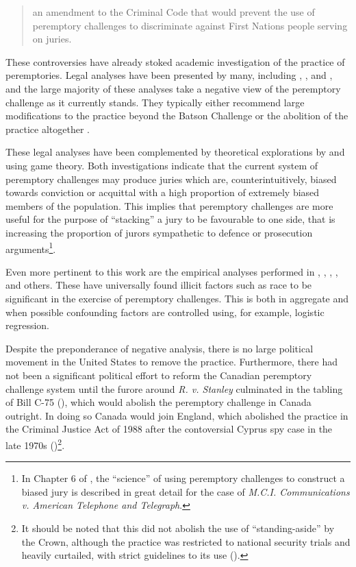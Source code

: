 \begin{quote}
  an amendment to the Criminal Code that would prevent the use of peremptory challenges to discriminate against First Nations
  people serving on juries.
\end{quote}

These controversies have already stoked academic investigation of the practice of peremptories. Legal analyses have been
presented by many, including \cite{hoffman1997}, \cite{broderick1992}, and \cite{Nunn1993}, and the large majority of these
analyses take a negative view of the peremptory challenge as it currently stands. They typically either recommend large
modifications to the practice beyond the Batson Challenge or the abolition of the practice altogether .

These legal analyses have been complemented by theoretical explorations by \cite{ford2010} and \cite{flanagan2015} using game
theory. Both investigations indicate that the current system of peremptory challenges may produce juries which are, counterintuitively, biased
towards conviction or acquittal with a high proportion of extremely biased members of the population. This implies that peremptory challenges are more useful for the purpose of ``stacking'' a jury to be favourable to one side, that is increasing the proportion of jurors sympathetic to defence or prosecution arguments\footnote{In Chapter 6 of \cite{hansvidjudging}, the ``science'' of using peremptory challenges to construct a biased jury is described in great detail for the case of \textit{M.C.I. Communications v. American Telephone and Telegraph}.}.

Even more pertinent to this work are the empirical analyses performed in \cite{PerempChalMurder}, \cite{JurySunshineProj},
\cite{StubbornLegacy}, \cite{baldus2012}, and others. These have
universally found illicit factors such as race to be significant in
the exercise of peremptory challenges. This is both in aggregate and when possible confounding factors are controlled using, for example,
logistic regression.

Despite the preponderance of negative analysis, there is no large political movement in the United States to remove the
practice. Furthermore, there had not been a significant political effort to reform the Canadian peremptory challenge system until the
furore around \textit{R. v. Stanley} culminated in the tabling of Bill C-75 (\cite{c75legisinfo}), which would abolish the peremptory
challenge in Canada outright. In doing so Canada would join England, which abolished the practice in the Criminal
Justice Act of 1988 after the contoversial Cyprus spy case in the late 1970s (\cite{hoffman1997})\footnote{It should be noted
  that this did not abolish the use of ``standing-aside'' by the Crown, although the practice was restricted to national security
  trials and heavily curtailed, with strict guidelines to its use (\cite{attgenguide}).}.

